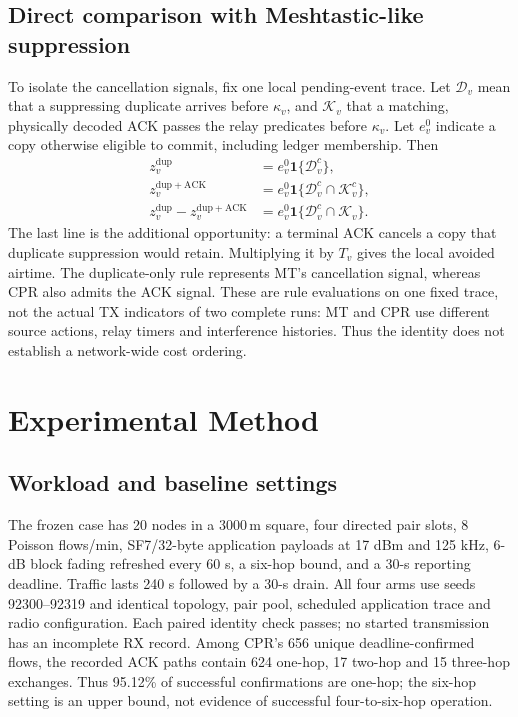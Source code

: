 \documentclass[conference,letterpaper,10pt]{IEEEtran}
\begin{document}
\subsection{Direct comparison with Meshtastic-like suppression}
To isolate the cancellation signals, fix one local pending-event trace.
Let $\mathcal D_v$ mean that a suppressing duplicate arrives before
$\kappa_v$, and $\mathcal K_v$ that a matching, physically decoded ACK
passes the relay predicates before $\kappa_v$. Let $e_v^0$ indicate a copy
otherwise eligible to commit, including ledger membership. Then
\begin{equation}
\begin{aligned}
z_v^{\mathrm{dup}}&=e_v^0\mathbf 1\{\mathcal D_v^c\},\\
z_v^{\mathrm{dup+ACK}}
 &=e_v^0\mathbf 1\{\mathcal D_v^c\cap\mathcal K_v^c\},\\
z_v^{\mathrm{dup}}-z_v^{\mathrm{dup+ACK}}
 &=e_v^0\mathbf 1\{\mathcal D_v^c\cap\mathcal K_v\}.
\end{aligned}
\label{eq:cancel-signal-contrast}
\end{equation}
The last line is the additional opportunity: a terminal ACK cancels a copy
that duplicate suppression would retain. Multiplying it by $T_v$ gives the
local avoided airtime. The duplicate-only rule represents MT's cancellation
signal, whereas CPR also admits the ACK signal. These are rule evaluations
on one fixed trace, not the actual TX indicators of two complete runs:
MT and CPR use different source actions, relay timers and interference
histories. Thus the identity does not establish a network-wide cost ordering.

\section{Experimental Method}
\subsection{Workload and baseline settings}
The frozen case has 20 nodes in a $3000\,\mathrm{m}$ square, four directed
pair slots, 8 Poisson flows/min, SF7/32-byte application payloads at 17 dBm
and 125 kHz, 6-dB block fading refreshed every 60 s, a six-hop bound,
and a 30-s reporting deadline. Traffic lasts 240 s followed by a 30-s drain.
All four arms use seeds 92300--92319 and identical topology, pair pool,
scheduled application trace and radio configuration. Each paired identity
check passes; no started transmission has an incomplete RX record.
Among CPR's 656 unique deadline-confirmed flows, the recorded ACK paths
contain 624 one-hop, 17 two-hop and 15 three-hop exchanges.
Thus 95.12\% of successful confirmations are one-hop; the six-hop setting
is an upper bound, not evidence of successful four-to-six-hop operation.
\end{document}
